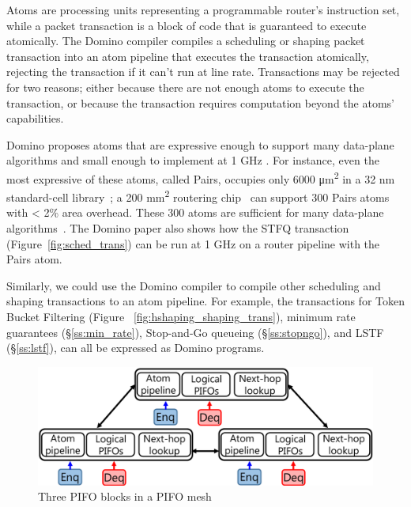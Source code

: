 Atoms are processing units representing a programmable router's instruction
set, while a packet transaction is a block of code that is guaranteed to
execute atomically.  The Domino compiler compiles a scheduling or shaping packet
transaction into an atom pipeline that executes the transaction
atomically, rejecting the transaction if it can't run at line rate.
Transactions may be rejected for two reasons; either because there are
not enough atoms to execute the transaction, or because the
transaction requires computation beyond the atoms' capabilities.
 
Domino proposes atoms that are expressive enough to support many
data-plane algorithms and small enough to implement at 1 GHz . For
instance, even the most expressive of these atoms, called Pairs,
occupies only 6000 \si{\micro\metre\squared} in a 32 nm standard-cell
library~\cite{domino_sigcomm}; a 200 \si{\milli\metre\squared}
routering chip~\cite{glen_parsing} can support 300 Pairs atoms with
< 2\% area overhead. These 300 atoms are sufficient for
many data-plane algorithms~\cite{domino_sigcomm}. The Domino paper
also shows how the STFQ transaction (Figure~\ref{fig:sched_trans}) can
be run at 1 GHz on a router pipeline with the Pairs atom.

Similarly, we could use the Domino compiler to compile other
scheduling and shaping transactions to an atom pipeline.  For example,
the transactions for Token Bucket Filtering (Figure
~\ref{fig:hshaping_shaping_trans}), minimum rate guarantees
(\S\ref{ss:min_rate}), Stop-and-Go queueing
(\S\ref{ss:stopngo}), and LSTF (\S\ref{ss:lstf}), can all
be expressed as Domino programs.  

\begin{figure}[!t]
  \centering
  \includegraphics[width=0.6\columnwidth]{pifo_pifo_mesh.pdf}
  \caption{Three PIFO blocks in a PIFO mesh}
  \label{fig:mesh}
\end{figure}

